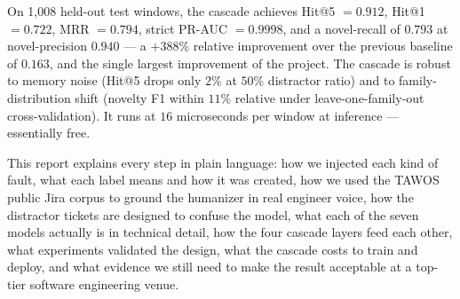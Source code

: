 On 1{,}008 held-out test windows, the cascade achieves Hit@5 $= 0.912$, Hit@1 $= 0.722$, MRR $= 0.794$, strict PR-AUC $= 0.9998$, and a novel-recall of $0.793$ at novel-precision $0.940$ --- a $+388\%$ relative improvement over the previous baseline of $0.163$, and the single largest improvement of the project. The cascade is robust to memory noise (Hit@5 drops only $2\%$ at $50\%$ distractor ratio) and to family-distribution shift (novelty F1 within $11\%$ relative under leave-one-family-out cross-validation). It runs at $16$ microseconds per window at inference --- essentially free.

This report explains every step in plain language: how we injected each kind of fault, what each label means and how it was created, how we used the TAWOS public Jira corpus to ground the humanizer in real engineer voice, how the distractor tickets are designed to confuse the model, what each of the seven models actually is in technical detail, how the four cascade layers feed each other, what experiments validated the design, what the cascade costs to train and deploy, and what evidence we still need to make the result acceptable at a top-tier software engineering venue.
